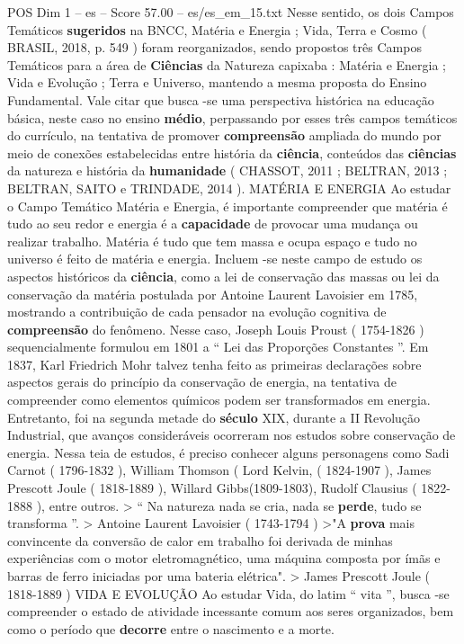 \begin{textsample}{POS Dim 1 – es – Score 57.00 – es/es\_em\_15.txt}
Nesse sentido, os dois Campos Temáticos \textbf{sugeridos} na BNCC, Matéria e Energia ; Vida, Terra e Cosmo ( BRASIL, 2018, p. 549 ) foram reorganizados, sendo propostos três Campos Temáticos para a área de \textbf{Ciências} da Natureza capixaba : Matéria e Energia ; Vida e Evolução ; Terra e Universo, mantendo a mesma proposta do Ensino Fundamental.
Vale citar que busca -se uma perspectiva histórica na educação básica, neste caso no ensino \textbf{médio}, perpassando por esses três campos temáticos do currículo, na tentativa de promover \textbf{compreensão} ampliada do mundo por meio de conexões estabelecidas entre história da \textbf{ciência}, conteúdos das \textbf{ciências} da natureza e história da \textbf{humanidade} ( CHASSOT, 2011 ; BELTRAN, 2013 ; BELTRAN, SAITO e TRINDADE, 2014 ).
MATÉRIA E ENERGIA Ao estudar o Campo Temático Matéria e Energia, é importante compreender que matéria é tudo ao seu redor e energia é a \textbf{capacidade} de provocar uma mudança ou realizar trabalho.
Matéria é tudo que tem massa e ocupa espaço e tudo no universo é feito de matéria e energia.
Incluem -se neste campo de estudo os aspectos históricos da \textbf{ciência}, como a lei de conservação das massas ou lei da conservação da matéria postulada por Antoine Laurent Lavoisier em 1785, mostrando a contribuição de cada pensador na evolução cognitiva de \textbf{compreensão} do fenômeno.
Nesse caso, Joseph Louis Proust ( 1754-1826 ) sequencialmente formulou em 1801 a “ Lei das Proporções Constantes ”.
Em 1837, Karl Friedrich Mohr talvez tenha feito as primeiras declarações sobre aspectos gerais do princípio da conservação de energia, na tentativa de compreender como elementos químicos podem ser transformados em energia.
Entretanto, foi na segunda metade do \textbf{século} XIX, durante a II Revolução Industrial, que avanços consideráveis ocorreram nos estudos sobre conservação de energia.
Nessa teia de estudos, é preciso conhecer alguns personagens como Sadi Carnot ( 1796-1832 ), William Thomson ( Lord Kelvin, ( 1824-1907 ), James Prescott Joule ( 1818-1889 ), Willard Gibbs(1809-1803), Rudolf Clausius ( 1822-1888 ), entre outros. > “ Na natureza nada se cria, nada se \textbf{perde}, tudo se transforma ”. > Antoine Laurent Lavoisier ( 1743-1794 ) >"A \textbf{prova} mais convincente da conversão de calor em trabalho foi derivada de minhas experiências com o motor eletromagnético, uma máquina composta por ímãs e barras de ferro iniciadas por uma bateria elétrica". > James Prescott Joule ( 1818-1889 ) VIDA E EVOLUÇÃO Ao estudar Vida, do latim “ vita ”, busca -se compreender o estado de atividade incessante comum aos seres organizados, bem como o período que \textbf{decorre} entre o nascimento e a morte.

\end{textsample}
